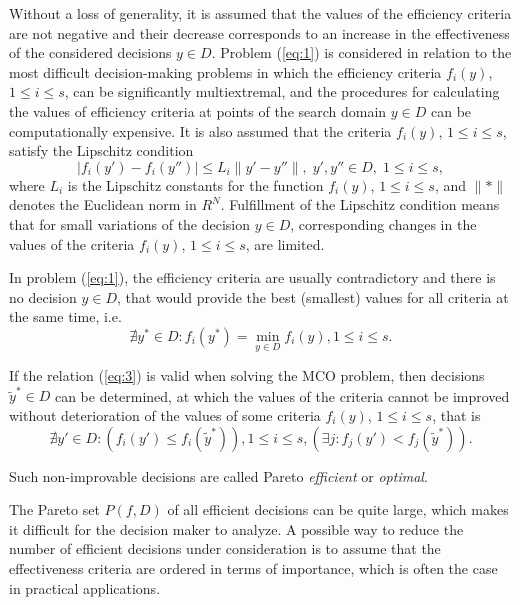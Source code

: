 \documentclass[smallextended]{svjour3}       %
\begin{document}
Without a loss of generality, it is assumed that the values of the efficiency criteria are not negative and their decrease corresponds to an increase in the effectiveness of the considered decisions $y \in D$. Problem (\ref{eq:1}) is considered in relation to the most difficult decision-making problems in which the efficiency criteria $f_i(y)$, $1 \leq i \leq s$, can be significantly multiextremal, and the procedures for calculating the values of efficiency criteria at points of the search domain $y \in D$ can be computationally expensive. It is also assumed that the criteria $f_i(y)$, $1 \leq i \leq s$, satisfy the Lipschitz condition
\begin{equation}\label{eq:2l}
|f_i (y')-f_i (y'')| \leq L_i \|y'-y''\|, \; y',y''\in D,\; 1 \leq i \leq s,
\end{equation}
where $L_i$ is the Lipschitz constants for the function $f_i(y)$, $1 \leq i \leq s$, and $\|*\|$ denotes the Euclidean norm in $R^N$. Fulfillment of the Lipschitz condition means that for small variations of the decision $y \in D$, corresponding changes in the values of the criteria $f_i(y)$, $1 \leq i \leq s$, are limited.

In problem (\ref{eq:1}), the efficiency criteria are usually contradictory and there is no decision $y \in D$, that would provide the best (smallest) values for all criteria at the same time, i.e.
\begin{equation}\label{eq:3}
\nexists y^*\in D: f_i(y^*) = \min_{y \in D} {f_i (y)} , 1 \leq i \leq s.
\end{equation}

If the relation (\ref{eq:3}) is valid when solving the MCO problem, then decisions $\widetilde{y}^* \in D$ can be determined, at which the values of the criteria cannot be improved without deterioration of the values of some criteria $f_i(y)$, $1 \leq i \leq s$, that is
\begin{equation}\label{eq:4}
\nexists y'\in D: (f_i(y') \leq f_i(\widetilde{y}^*)), 1 \leq i \leq s, (\exists j : f_j(y') < f_j(\widetilde{y}^*)).
\end{equation}

Such non-improvable decisions are called Pareto \textit{efficient} or \textit{optimal}.

The Pareto set $P(f,D)$ of all efficient decisions can be quite large, which makes it difficult for the decision maker to analyze. A possible way to reduce the number of efficient decisions under consideration is to assume that the effectiveness criteria are ordered in terms of importance, which is often the case in practical applications.
\end{document}

